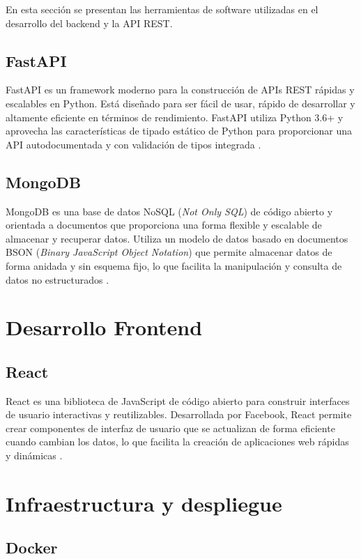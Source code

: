 En esta sección se presentan las herramientas de software utilizadas en el
desarrollo del backend y la API REST.

\subsection{FastAPI}

FastAPI es un framework moderno para la construcción de APIs REST rápidas y
escalables en Python. Está diseñado para ser fácil de usar, rápido de
desarrollar y altamente eficiente en términos de rendimiento. FastAPI utiliza
Python 3.6+ y aprovecha las características de tipado estático de Python para
proporcionar una API autodocumentada y con validación de tipos integrada
\cite{FastAPI}.

\subsection{MongoDB}

MongoDB es una base de datos NoSQL (\textit{Not Only SQL}) de código abierto y
orientada a documentos que proporciona una forma flexible y escalable de
almacenar y recuperar datos. Utiliza un modelo de datos basado en documentos
BSON (\textit{Binary JavaScript Object Notation}) que permite almacenar datos
de forma anidada y sin esquema fijo, lo que facilita la manipulación y consulta
de datos no estructurados \cite{MongoDB}.

\section{Desarrollo Frontend}

\subsection{React}

React es una biblioteca de JavaScript de código abierto para construir
interfaces de usuario interactivas y reutilizables. Desarrollada por Facebook,
React permite crear componentes de interfaz de usuario que se actualizan de
forma eficiente cuando cambian los datos, lo que facilita la creación de
aplicaciones web rápidas y dinámicas \cite{React}.

\section{Infraestructura y despliegue}

\subsection{Docker}

